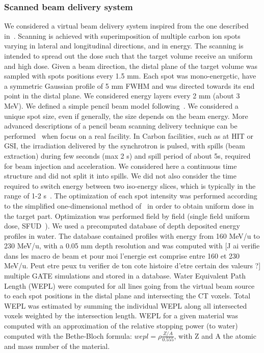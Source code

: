 \documentclass[11pt]{iopart}
\newcommand{\sjnote}[1]{{\color{red}[#1]}}
\begin{document}
\subsubsection{Scanned beam delivery system}

We considered a virtual beam delivery system inspired from the one
described in~\cite{Kramer2000a}. Scanning is achieved with
superimposition of multiple carbon ion spots varying in lateral and
longitudinal directions, and in energy. The scanning is intended to
spread out the dose such that the target volume receive an uniform and
high dose.  Given a beam direction, the distal plane of the target
volume was sampled with spots positions every 1.5 mm. Each spot was
mono-energetic, have a symmetric Gaussian profile of 5 mm FWHM and was
directed towards its end point in the distal plane. We considered
energy layers every 2 mm (about 3 MeV). We defined a simple pencil
beam model following~\cite{Grevillot2010}. We considered a unique spot
size, even if generally, the size depends on the beam energy. More
advanced descriptions of a pencil beam scanning delivery technique can
be performed~\cite{Grevillot2011} when focus on a real facility. In
Carbon facilities, such as at HIT or GSI, the irradiation delivered by
the synchrotron is pulsed, with spills (beam extraction) during few
seconds (max 2 s) and spill period of about 5s, required for beam
injection and acceleration. We considered here a continuous time
structure and did not split it into spills. We did not also consider
the time required to switch energy between two iso-energy slices,
which is typically in the range of 1-2 s~\cite{Rietzel2010}. The
optimization of each spot intensity was performed according to the
simplified one-dimensional method of~\cite{Kramer2000a} in order to
obtain uniform dose in the target part. Optimization was performed
field by field (single field uniform dose, SFUD~\cite{Lomax1999}). We
used a precomputed database of depth deposited energy profiles in
water. The database contained profiles with energy from 160 MeV/u to
230 MeV/u, with a 0.05 mm depth resolution and was computed with
\sjnote{J ai verifie dans les macro de beam et pour moi l'energie est comprise entre 160 et 230 MeV/u. Peut etre peux tu verifier de ton cote histoire d'etre certain des valeurs ?}
multiple GATE simulations and stored in a database. Water Equivalent
Path Length (WEPL) were computed for all lines going from the virtual
beam source to each spot positions in the distal plane and
intersecting the CT voxels. Total WEPL was estimated by summing the
individual WEPL along all intersected voxels weighted by the
intersection length. WEPL for a given material was computed with an
approximation of the relative stopping power (to water) computed with
the Bethe-Bloch formula: $wepl = \rho \frac{Z/A}{0.555}$, with Z and A
the atomic and mass number of the material.
\end{document}
